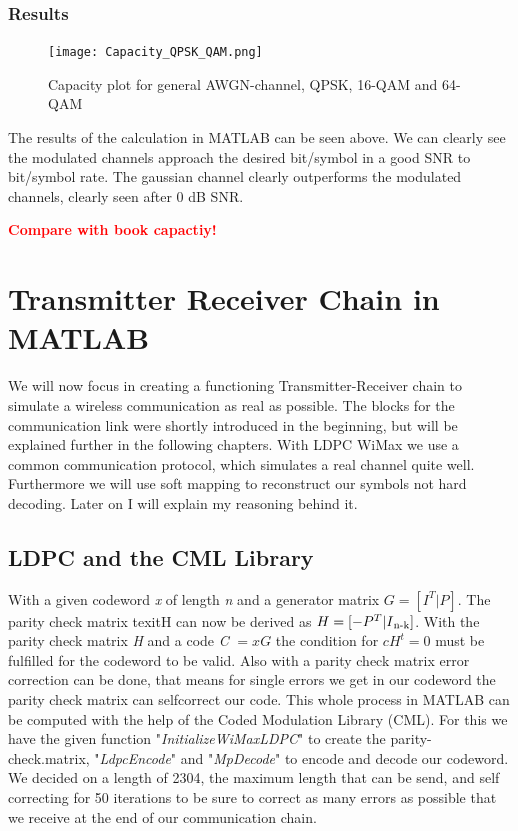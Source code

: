 \documentclass[12pt,oneside, reqno]{report}
\newcommand\boldred[1]{\textcolor{red}{\textbf{#1}}}
\begin{document}
\subsection{Results}
\begin{figure}[H]
	\centering
	\texttt{[image: Capacity\_QPSK\_QAM.png]}
	\caption{Capacity plot for general AWGN-channel, QPSK, 16-QAM and 64-QAM}
	\label{fig:Modulation}
\end{figure}
The results of the calculation in MATLAB can be seen above. We can clearly see the modulated channels approach the desired bit/symbol in a good SNR to bit/symbol rate. The gaussian channel clearly outperforms the modulated channels, clearly seen after 0 dB SNR.

\boldred{Compare with book capactiy!}


\chapter{Transmitter Receiver Chain in MATLAB}

We will now focus in creating a functioning Transmitter-Receiver chain to simulate a wireless communication as real as possible. The blocks for the communication link were shortly introduced in the beginning, but will be explained further in the following chapters. With LDPC WiMax we use a common communication protocol, which simulates a real channel quite well. Furthermore we will use soft mapping to reconstruct our symbols not hard decoding. Later on I will explain my reasoning behind it.  

\section{LDPC and the CML Library}
With a given codeword \textit{x} of length \textit{n} and a generator matrix $G = [I^T|P]$. The parity check matrix texit{H} can now be derived as $H = [-P^T|I\textsubscript{n-k}]$. With the parity check matrix \textit{H} and a code \textit{C} $= xG$ the condition for $cH^t = 0$ must be fulfilled for the codeword to be valid.  
Also with a parity check matrix error correction can be done, that means for single errors we get in our codeword the parity check matrix can selfcorrect our code.
This whole process in MATLAB can be computed with the help of the Coded Modulation Library (CML). For this we have the given function "\textit{InitializeWiMaxLDPC}" to create the parity-check.matrix, "\textit{LdpcEncode}" and "\textit{MpDecode}" to encode and decode our codeword.
We decided on a length of 2304, the maximum length that can be send, and self correcting for 50 iterations to be sure to correct as many errors as possible that we receive at the end of our communication chain.
\end{document}
